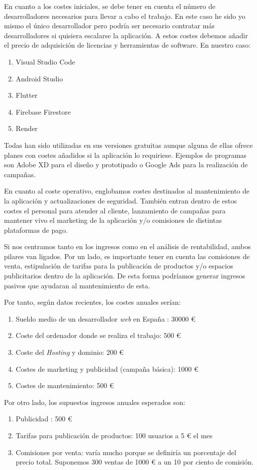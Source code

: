	En cuanto a los costes iniciales, se debe tener en cuenta el número de desarrolladores necesarios para llevar a cabo el trabajo. En este caso he sido yo mismo el único desarrollador pero podría ser necesario contratar más desarrolladores si quisiera escalarse la aplicación. A estos costes debemos añadir el precio de adquisición de licencias y herramientas de software. En nuestro caso:
	\begin{enumerate}
		\item Visual Studio Code
		\item Android Studio
		\item Flutter
		\item Firebase Firestore
		\item Render
	\end{enumerate}
	Todas han sido utilizadas en sus versiones gratuitas aunque alguna de ellas ofrece planes con costes añadidos si la aplicación lo requiriese. Ejemplos de programas son Adobe XD para el diseño y prototipado o Google Ads para la realización de campañas.
	
	En cuanto al coste operativo, englobamos costes destinados al mantenimiento de la aplicación y actualizaciones de seguridad. También entran dentro de estos costes el personal para atender al cliente, lanzamiento de campañas para mantener vivo el marketing de la aplicación y/o comisiones de distintas plataformas de pago.
	
	Si nos centramos tanto en los ingresos como en el análisis de rentabilidad, ambos pilares van ligados. Por un lado, es importante tener en cuenta las comisiones de venta, estipulación de tarifas para la publicación de productos y/o espacios publicitarios dentro de la aplicación. De esta forma podríamos generar ingresos pasivos que ayudaran al mantenimiento de esta.
	
	Por tanto, según datos recientes, los costes anuales serían:
	\begin{enumerate}
		\item Sueldo medio de un desarrollador \emph{web} en España : 30000 €
		\item Coste del ordenador donde se realiza el trabajo: 500 €
		\item Coste del \emph{Hosting} y dominio: 200 €
		\item Costes de marketing y publicidad (campaña básica): 1000 €
		\item Costes de mantenimiento: 500 €
	\end{enumerate}
	
	Por otro lado, los supuestos ingresos anuales esperados son:
	\begin{enumerate}
		\item Publicidad : 500 €
		\item Tarifas para publicación de productos: 100 usuarios a 5 € el mes
		\item Comisiones por venta: varía mucho porque se definiría un porcentaje del precio total. Suponemos 300 ventas de 1000 € a un 10 por ciento de comisión.
	\end{enumerate}
	
